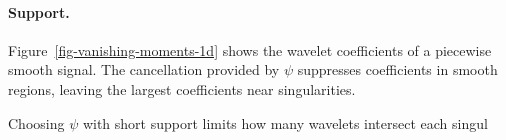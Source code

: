  
\paragraph{Support.}

Figure~\ref{fig-vanishing-moments-1d} shows the wavelet coefficients of a piecewise smooth signal. The cancellation provided by $\psi$ suppresses coefficients in smooth regions, leaving the largest coefficients near singularities.


Choosing $\psi$ with short support limits how many wavelets intersect each singul